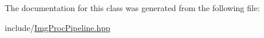 \-The documentation for this class was generated from the following file\-:\begin{DoxyCompactItemize}
\item 
include/\hyperlink{ImgProcPipeline_8hpp}{\-Img\-Proc\-Pipeline.\-hpp}\end{DoxyCompactItemize}
